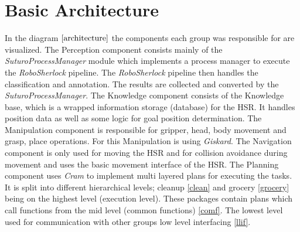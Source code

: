 \documentclass[main.tex]{subfiles}
\begin{document}
		\section{Basic Architecture}

			In the diagram \(\ref{architecture}\) the components each group was responsible for are visualized. The Perception component consists mainly of the \textit{SuturoProcessManager} module which implements a process manager to execute the \textit{RoboSherlock} pipeline. The \textit{RoboSherlock} pipeline then handles the classification and annotation. The results are collected and converted by the \textit{SuturoProcessManager}.  The Knowledge component consists of the Knowledge base, which is a wrapped information storage (database) for the HSR. It handles position data as well as some logic for goal position determination. The Manipulation component is responsible for gripper, head, body movement and grasp, place operations. For this Manipulation is using \textit{Giskard}. The Navigation component is only used for moving the HSR and for collision avoidance during movement and uses the basic movement interface of the HSR. The Planning component uses \textit{Cram} to implement multi layered plans for executing the tasks. It is split into different hierarchical levels; cleanup \ref{clean} and grocery \ref{grocery} being on the highest level (execution level). These packages contain plans which call functions from the mid level (common functions) \ref{comf}. The lowest level used for communication with other groups low level interfacing \ref{llif}.
			
\end{document}
